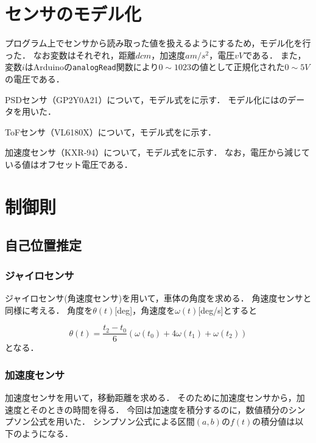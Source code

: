\documentclass[11pt,a4]{jsarticle}
\begin{document}

\section{センサのモデル化}
  プログラム上でセンサから読み取った値を扱えるようにするため，モデル化を行った．
  なお変数はそれぞれ，距離$d\unit{cm}$，加速度$a\unit{m/s^2}$，電圧$v\unit{V}$である．
  また，変数$i$はArduinoの\texttt{analogRead}関数により$0\sim1023$の値として正規化された$0\sim5\unit{V}$の電圧である．

  PSDセンサ（GP2Y0A21）について，モデル式をに示す．
  モデル化にはのデータを用いた．

  ToFセンサ（VL6180X）について，モデル式をに示す．

  加速度センサ（KXR-94）について，モデル式をに示す．
  なお，電圧から減じている値はオフセット電圧である．

\section{制御則}

\subsection{自己位置推定}
\subsubsection{ジャイロセンサ}
ジャイロセンサ(角速度センサ)を用いて，車体の角度を求める．
角速度センサと同様に考える．
角度を$\theta(t)$[deg]，角速度を$\omega(t)$[deg/s]とすると

\begin{equation}
 \theta(t)=\frac{t_2-t_0}{6}(\omega(t_0)+4\omega(t_1)+\omega(t_2) )
\end{equation}
となる．

\subsubsection{加速度センサ}
加速度センサを用いて，移動距離を求める．
そのために加速度センサから，加速度とそのときの時間を得る．
今回は加速度を積分するのに，数値積分のシンプソン公式を用いた．
シンプソン公式による区間$(a,b)$の$f(t)$の積分値は以下のようになる．
\end{document}

